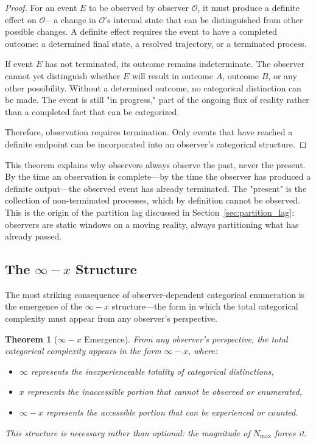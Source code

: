 \documentclass[12pt,a4paper]{article}
\newtheorem{theorem}{Theorem}[section]
\theoremstyle{definition}
\theoremstyle{remark}
\newcommand{\Nmax}{N_{\text{max}}}
\begin{document}
\begin{proof}
For an event $E$ to be observed by observer $\mathcal{O}$, it must produce a definite effect on $\mathcal{O}$—a change in $\mathcal{O}$'s internal state that can be distinguished from other possible changes. A definite effect requires the event to have a completed outcome: a determined final state, a resolved trajectory, or a terminated process.

If event $E$ has not terminated, its outcome remains indeterminate. The observer cannot yet distinguish whether $E$ will result in outcome $A$, outcome $B$, or any other possibility. Without a determined outcome, no categorical distinction can be made. The event is still "in progress," part of the ongoing flux of reality rather than a completed fact that can be categorized.

Therefore, observation requires termination. Only events that have reached a definite endpoint can be incorporated into an observer's categorical structure.
\end{proof}

This theorem explains why observers always observe the past, never the present. By the time an observation is complete—by the time the observer has produced a definite output—the observed event has already terminated. The "present" is the collection of non-terminated processes, which by definition cannot be observed. This is the origin of the partition lag discussed in Section~\ref{sec:partition_lag}: observers are static windows on a moving reality, always partitioning what has already passed.

\subsection{The $\infty - x$ Structure}

The most striking consequence of observer-dependent categorical enumeration is the emergence of the $\infty - x$ structure—the form in which the total categorical complexity must appear from any observer's perspective.

\begin{theorem}[$\infty - x$ Emergence]
\label{thm:infinity_minus_x}
From any observer's perspective, the total categorical complexity appears in the form $\infty - x$, where:
\begin{itemize}
    \item $\infty$ represents the inexperienceable totality of categorical distinctions,
    \item $x$ represents the inaccessible portion that cannot be observed or enumerated,
    \item $\infty - x$ represents the accessible portion that can be experienced or counted.
\end{itemize}
This structure is necessary rather than optional: the magnitude of $\Nmax$ forces it.
\end{theorem}
\end{document}
